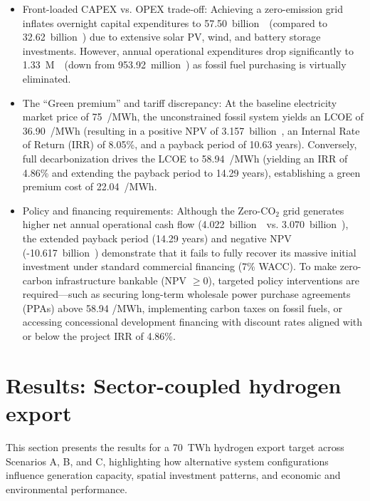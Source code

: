 \documentclass[preprint,12pt]{elsarticle}
\begin{document}
\begin{itemize}
    \item {Front-loaded CAPEX vs. OPEX trade-off:} Achieving a zero-emission grid inflates overnight capital expenditures to 57.50~billion~\texteuro~(compared to 32.62~billion~\texteuro) due to extensive solar PV, wind, and battery storage investments. However, annual operational expenditures drop significantly to 1.33~M~\texteuro~(down from 953.92~million~\texteuro) as fossil fuel purchasing is virtually eliminated.
    \item {The ``Green premium'' and tariff discrepancy:} At the baseline electricity market price of 75~\texteuro/MWh, the unconstrained fossil system yields an LCOE of 36.90~\texteuro/MWh (resulting in a positive NPV of 3.157~billion~\texteuro, an Internal Rate of Return (IRR) of 8.05\%, and a payback period of 10.63 years). Conversely, full decarbonization drives the LCOE to 58.94~\texteuro/MWh (yielding an IRR of 4.86\% and extending the payback period to 14.29 years), establishing a green premium cost of 22.04~\texteuro/MWh.
    \item {Policy and financing requirements:} Although the Zero-$\text{CO}_2$ grid generates higher net annual operational cash flow (4.022~billion~\texteuro~vs.  3.070~billion~\texteuro), the extended payback period (14.29 years) and negative NPV (-10.617~billion~\texteuro) demonstrate that it fails to fully recover its massive initial investment under standard commercial financing (7\% WACC). To make zero-carbon infrastructure bankable (NPV $\ge 0$), targeted policy interventions are required—such as securing long-term wholesale power purchase agreements (PPAs) above 58.94 \texteuro/MWh, implementing carbon taxes on fossil fuels, or accessing concessional development financing with discount rates aligned with or below the project IRR of 4.86\%.
\end{itemize}

\section{Results: Sector-coupled hydrogen export} 
\label{sec:results_sector_coupled_h2_3secns} 
This section presents the results for a 70~TWh hydrogen export target across Scenarios A, B, and C, highlighting how alternative system configurations influence generation capacity, spatial investment patterns, and economic and environmental performance.
\end{document}
